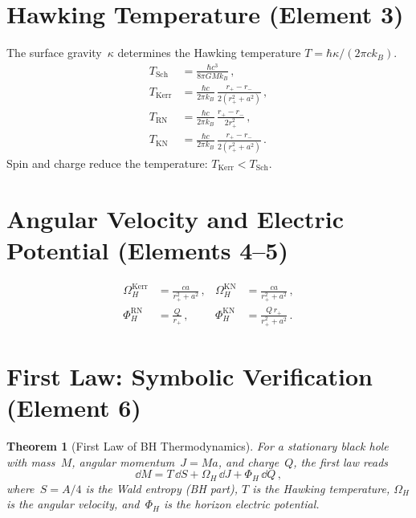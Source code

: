 \documentclass[11pt,a4paper]{article}
\newtheorem{theorem}{Theorem}[section]
\newcommand{\OmH}{\Omega_H}
\newcommand{\PhiH}{\Phi_H}
\begin{document}
\section{Hawking Temperature (Element 3)}\label{sec:temperature}

The surface gravity~$\kappa$ determines the Hawking temperature
$T = \hbar\kappa/(2\pi c k_B)$.
\begin{align}
  T_{\mathrm{Sch}} &= \frac{\hbar c^3}{8\pi G M k_B}\,,  \\
  T_{\mathrm{Kerr}} &= \frac{\hbar c}{2\pi k_B}\,
    \frac{r_+ - r_-}{2(r_+^2 + a^2)}\,,  \\
  T_{\mathrm{RN}} &= \frac{\hbar c}{2\pi k_B}\,
    \frac{r_+ - r_-}{2r_+^2}\,,  \\
  T_{\mathrm{KN}} &= \frac{\hbar c}{2\pi k_B}\,
    \frac{r_+ - r_-}{2(r_+^2 + a^2)}\,.
\end{align}
Spin and charge reduce the temperature: $T_{\mathrm{Kerr}} < T_{\mathrm{Sch}}$.

\section{Angular Velocity and Electric Potential (Elements 4--5)}
\label{sec:omega-phi}

\begin{align}
  \OmH^{\mathrm{Kerr}} &= \frac{ca}{r_+^2 + a^2}\,, &
  \OmH^{\mathrm{KN}} &= \frac{ca}{r_+^2 + a^2}\,, \\
  \PhiH^{\mathrm{RN}} &= \frac{Q}{r_+}\,, &
  \PhiH^{\mathrm{KN}} &= \frac{Q\,r_+}{r_+^2 + a^2}\,.
\end{align}

\section{First Law: Symbolic Verification (Element 6)}\label{sec:first-law-sym}

\begin{theorem}[First Law of BH Thermodynamics]\label{thm:first-law}
For a stationary black hole with mass~$M$, angular momentum~$J = Ma$,
and charge~$Q$, the first law reads
\begin{equation}\label{eq:first-law}
  \dd M = T\,\dd S + \OmH\,\dd J + \PhiH\,\dd Q\,,
\end{equation}
where~$S = A/4$ is the Wald entropy (BH part), $T$ is the Hawking
temperature, $\OmH$ is the angular velocity, and~$\PhiH$ is the
horizon electric potential.
\end{theorem}
\end{document}
